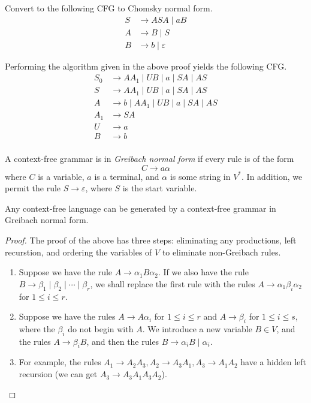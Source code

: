 \begin{exercise}
Convert to the following CFG to Chomsky normal form.
\begin{align*}
    S&\to ASA\mid aB \\
    A&\to B\mid S \\
    B&\to b\mid\varepsilon
\end{align*}
\end{exercise}
\begin{solution}
Performing the algorithm given in the above proof yields the following CFG.
\begin{align*}
    S_0&\to AA_1\mid UB\mid a\mid SA\mid AS \\
    S&\to AA_1\mid UB\mid a\mid SA\mid AS \\
    A&\to b\mid AA_1\mid UB\mid a\mid SA\mid AS \\
    A_1&\to SA \\
    U&\to a \\
    B&\to b \\
\end{align*}
\end{solution}

\begin{definition}
    A context-free grammar is in \textit{Greibach normal form} if every rule is of the form
    \[ C \to a\alpha \]
    where $C$ is a variable, $a$ is a terminal, and $\alpha$ is some string in $V^*$. In addition, we permit the rule $S\to\varepsilon$, where $S$ is the start variable.
\end{definition}

\begin{theorem}
    Any context-free language can be generated by a context-free grammar in Greibach normal form.
\end{theorem}
\begin{proof}
    The proof of the above has three steps: eliminating any productions, left recurstion, and ordering the variables of $V$ to eliminate non-Greibach rules.
    \begin{enumerate}
        \item Suppose we have the rule $A \to \alpha_1 B \alpha_2$. If we also have the rule $B \to \beta_1 \mid \beta_2 \mid \cdots \mid \beta_r$, we shall replace the first rule with the rules $A \to \alpha_1 \beta_i \alpha_2$ for $1 \le i \le r$.

        \item Suppose we have the rules $A \to A\alpha_i$ for $1 \le i \le r$ and $A \to \beta_i$ for $1 \le i \le s$, where the $\beta_i$ do not begin with $A$. We introduce a new variable $B \in V$, and the rules $A \to \beta_i B$, and then the rules $B \to \alpha_i B \mid \alpha_i$.

        \item For example, the rules $A_1 \to A_2 A_3, A_2 \to A_3 A_1, A_3 \to A_1 A_2$ have a hidden left recursion (we can get $A_3 \to A_3 A_1 A_3 A_2$). 
    \end{enumerate}
\end{proof}

